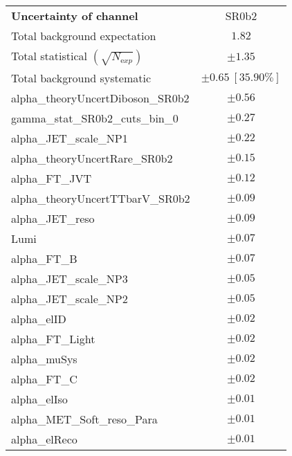 
\begin{table}
\begin{center}
\setlength{\tabcolsep}{0.0pc}
\begin{tabular*}{\textwidth}{@{\extracolsep{\fill}}lc}
\noalign{\smallskip}\hline\noalign{\smallskip}
{\bfseries Uncertainty of channel}                                    & SR0b2            \\
\noalign{\smallskip}\hline\noalign{\smallskip}
Total background expectation             &  $1.82$       \\
\noalign{\smallskip}\hline\noalign{\smallskip}
Total statistical $(\sqrt{N_{\mathrm exp}})$              & $\pm 1.35$       \\
Total background systematic               & $\pm 0.65\ [35.90\%] $             \\
\noalign{\smallskip}\hline\noalign{\smallskip}
\noalign{\smallskip}\hline\noalign{\smallskip}
alpha\_theoryUncertDiboson\_SR0b2         & $\pm 0.56$       \\
gamma\_stat\_SR0b2\_cuts\_bin\_0         & $\pm 0.27$       \\
alpha\_JET\_scale\_NP1         & $\pm 0.22$       \\
alpha\_theoryUncertRare\_SR0b2         & $\pm 0.15$       \\
alpha\_FT\_JVT         & $\pm 0.12$       \\
alpha\_theoryUncertTTbarV\_SR0b2         & $\pm 0.09$       \\
alpha\_JET\_reso         & $\pm 0.09$       \\
Lumi         & $\pm 0.07$       \\
alpha\_FT\_B         & $\pm 0.07$       \\
alpha\_JET\_scale\_NP3         & $\pm 0.05$       \\
alpha\_JET\_scale\_NP2         & $\pm 0.05$       \\
alpha\_elID         & $\pm 0.02$       \\
alpha\_FT\_Light         & $\pm 0.02$       \\
alpha\_muSys         & $\pm 0.02$       \\
alpha\_FT\_C         & $\pm 0.02$       \\
alpha\_elIso         & $\pm 0.01$       \\
alpha\_MET\_Soft\_reso\_Para         & $\pm 0.01$       \\
alpha\_elReco         & $\pm 0.01$       \\

\end{tabular*}
\end{center}
\end{table}
